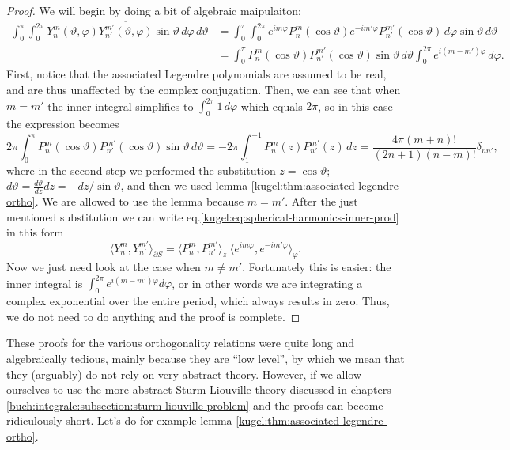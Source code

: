 \begin{proof}
  We will begin by doing a bit of algebraic maipulaiton:
  \begin{align*}
    \int_{0}^\pi \int_0^{2\pi}
      Y^m_n(\vartheta, \varphi) \overline{Y^{m'}_{n'}(\vartheta, \varphi)} 
      \sin \vartheta \, d\varphi \, d\vartheta
    &= \int_{0}^\pi \int_0^{2\pi}
      e^{im\varphi} P^m_n(\cos \vartheta)
      e^{-im'\varphi} P^{m'}_{n'}(\cos \vartheta)
      \, d\varphi \sin \vartheta \, d\vartheta 
    \\
    &= \int_{0}^\pi
      P^m_n(\cos \vartheta) P^{m'}_{n'}(\cos \vartheta) \sin \vartheta \, d\vartheta
      \int_0^{2\pi} e^{i(m - m')\varphi}
      \, d\varphi. 
  \end{align*}
  First, notice that the associated Legendre polynomials are assumed to be real,
  and are thus unaffected by the complex conjugation. Then, we can see that when
  $m = m'$ the inner integral simplifies to $\int_0^{2\pi} 1 \, d\varphi$ which
  equals $2\pi$, so in this case the expression becomes
  \begin{equation*}
    2\pi \int_{0}^\pi
      P^m_n(\cos \vartheta) P^{m'}_{n'}(\cos \vartheta)
    \sin \vartheta \, d\vartheta
    = -2\pi \int_{1}^{-1} P^m_n(z) P^{m'}_{n'}(z) \, dz
    = \frac{4\pi(m + n)!}{(2n + 1)(n - m)!} \delta_{nn'},
  \end{equation*}
  where in the second step we performed the substitution $z = \cos\vartheta$;
  $d\vartheta = \frac{d\vartheta}{dz} dz= - dz / \sin \vartheta$, and then we
  used lemma \ref{kugel:thm:associated-legendre-ortho}. 
  We are allowed to use
  the lemma because $m = m'$. After the just mentioned substitution we can write eq.\eqref{kugel:eq:spherical-harmonics-inner-prod} in this form
  \begin{equation*}
    \langle Y^m_n, Y^{m'}_{n'} \rangle_{\partial S} = \langle P^m_n, P^{m'}_{n'} \rangle_z \; \langle e^{im\varphi}, e^{-im'\varphi} \rangle_\varphi.
  \end{equation*} 
  Now we just need look at the case when $m \neq m'$. Fortunately this is
  easier: the inner integral is $\int_0^{2\pi} e^{i(m - m')\varphi} d\varphi$,
  or in other words we are integrating a complex exponential over the entire
  period, which always results in zero. Thus, we do not need to do anything and
  the proof is complete.
\end{proof}

These proofs for the various orthogonality relations were quite long and
algebraically tedious, mainly because they are ``low level'', by which we mean
that they (arguably) do not rely on very abstract theory. However, if we allow
ourselves to use the more abstract Sturm Liouville theory discussed in chapters
\ref{buch:integrale:subsection:sturm-liouville-problem} and  the proofs can become ridiculously
short. Let's do for example lemma \ref{kugel:thm:associated-legendre-ortho}.


